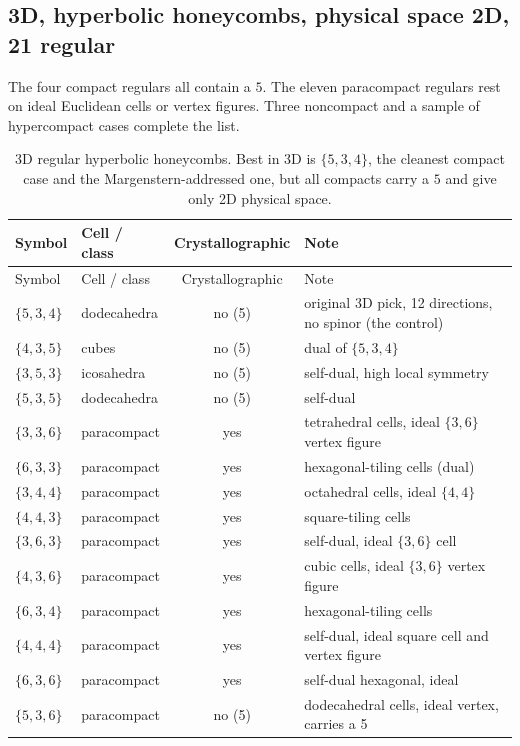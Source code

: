 \subsection{3D, hyperbolic honeycombs, physical space 2D, 21 regular}

The four compact regulars all contain a $5$. The eleven paracompact regulars rest on ideal Euclidean cells or
vertex figures. Three noncompact and a sample of hypercompact cases complete the list.

{\small
\begin{longtable}{l l c p{2.9in}}
\toprule
Symbol & Cell / class & Crystallographic & Note \\
\midrule
\endfirsthead
\toprule
Symbol & Cell / class & Crystallographic & Note \\
\midrule
\endhead
\bottomrule
\endfoot
\bottomrule
\caption{3D regular hyperbolic honeycombs. Best in 3D is $\{5,3,4\}$, the cleanest compact case and the
Margenstern-addressed one, but all compacts carry a $5$ and give only 2D physical space.}
\label{tab:catalog-3d}
\endlastfoot
$\{5,3,4\}$ & dodecahedra & no (5) & original 3D pick, 12 directions, no spinor (the control) \\
$\{4,3,5\}$ & cubes & no (5) & dual of $\{5,3,4\}$ \\
$\{3,5,3\}$ & icosahedra & no (5) & self-dual, high local symmetry \\
$\{5,3,5\}$ & dodecahedra & no (5) & self-dual \\
$\{3,3,6\}$ & paracompact & yes & tetrahedral cells, ideal $\{3,6\}$ vertex figure \\
$\{6,3,3\}$ & paracompact & yes & hexagonal-tiling cells (dual) \\
$\{3,4,4\}$ & paracompact & yes & octahedral cells, ideal $\{4,4\}$ \\
$\{4,4,3\}$ & paracompact & yes & square-tiling cells \\
$\{3,6,3\}$ & paracompact & yes & self-dual, ideal $\{3,6\}$ cell \\
$\{4,3,6\}$ & paracompact & yes & cubic cells, ideal $\{3,6\}$ vertex figure \\
$\{6,3,4\}$ & paracompact & yes & hexagonal-tiling cells \\
$\{4,4,4\}$ & paracompact & yes & self-dual, ideal square cell and vertex figure \\
$\{6,3,6\}$ & paracompact & yes & self-dual hexagonal, ideal \\
$\{5,3,6\}$ & paracompact & no (5) & dodecahedral cells, ideal vertex, carries a 5 \\

\end{longtable}}
